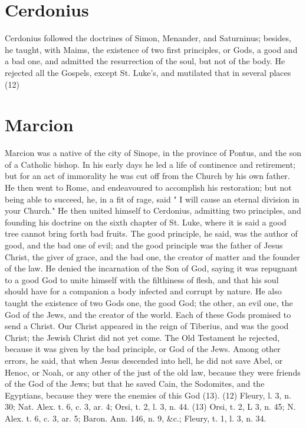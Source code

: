\documentclass[12pt]{book}
\begin{document}
\section{Cerdonius}
Cerdonius followed the doctrines of Simon, Menander, and Saturninus; besides, he taught, with
Maims, the existence of two first principles, or Gods, a good and a bad one, and admitted the resurrection
of the soul, but not of the body. He rejected all the Gospels, except St. Luke’s, and mutilated that in
several places (12)
\section{Marcion}
Marcion was a native of the city of Sinope, in the province of Pontus, and the son of a Catholic bishop.
In his early days he led a life of continence and retirement; but for an act of immorality he was cut off
from the Church by his own father. He then went to Rome, and endeavoured to accomplish his
restoration; but not being able to succeed, he, in a fit of rage, said " I will cause an eternal division in
your Church." He then united himself to Cerdonius, admitting two principles, and founding his doctrine
on the sixth chapter of St. Luke, where it is said a good tree cannot bring forth bad fruits. The good
principle, he said, was the author of good, and the bad one of evil; and the good principle was the father
of Jesus Christ, the giver of grace, and the bad one, the creator of matter and the founder of the law. He
denied the incarnation of the Son of God, saying it was repugnant to a good God to unite himself with the
filthiness of flesh, and that his soul should have for a companion a body infected and corrupt by nature.
He also taught the existence of two Gods one, the good God; the other, an evil one, the God of the Jews,
and the creator of the world. Each of these Gods promised to send a Christ. Our Christ appeared in the
reign of Tiberius, and was the good Christ; the Jewish Christ did not yet come. The Old Testament he
rejected, because it was given by the bad principle, or God of the Jews. Among other errors, he said, that
when Jesus descended into hell, he did not save Abel, or Henoc, or Noah, or any other of the just of the
old law, because they were friends of the God of the Jews; but that he saved Cain, the Sodomites, and the
Egyptians, because they were the enemies of this God (13).
(12) Fleury, l. 3, n. 30; Nat. Alex. t. 6, c. 3, ar. 4; Orsi, t. 2, l. 3, n. 44. 
(13) Orsi, t. 2, L 3, n. 45; N. Alex. t. 6, c. 3, ar. 5; Baron. Ann. 146, n. 9, \&c.; Fleury, t. 1, l. 3, n. 34.
\end{document}
